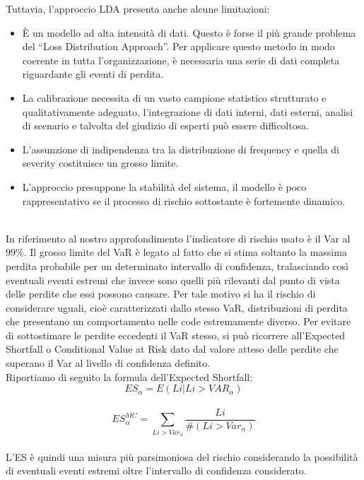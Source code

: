 \documentclass[titlepage]{article}
\begin{document}
\begin{itemize}
	 Tuttavia, l'approccio LDA presenta anche alcune limitazioni: 
	\begin{itemize}
	\item 	È un modello ad alta intensità di dati. Questo è forse il più grande problema del “Loss Distribution Approach”. Per applicare questo metodo in modo coerente in tutta l'organizzazione, è necessaria una serie di dati completa riguardante gli eventi di perdita.  
	\item La calibrazione necessita di un vasto campione statistico strutturato e qualitativamente adeguato, l’integrazione di dati interni, dati esterni, analisi di scenario e talvolta del giudizio di esperti può essere difficoltosa.  
	\item 	L’assunzione di indipendenza tra la distribuzione di frequency e quella di severity costituisce un grosso limite.  
	\item 	L’approccio presuppone la stabilità del sistema, il modello è poco rappresentativo se il processo di rischio sottostante è fortemente dinamico. 
\end{itemize}
\\
In riferimento al nostro approfondimento l’indicatore di rischio usato è il Var al 99\%. Il grosso limite del VaR è legato al fatto che si stima soltanto la massima perdita probabile per un determinato intervallo di confidenza, tralasciando così eventuali eventi estremi che invece sono quelli più rilevanti dal punto di vista delle perdite che essi possono causare. Per tale motivo si ha il rischio di considerare uguali, cioè caratterizzati dallo stesso VaR, distribuzioni di perdita che presentano un comportamento nelle code estremamente diverso. Per evitare di sottostimare le perdite eccedenti il VaR stesso, si può ricorrere all’Expected Shortfall o Conditional Value at Risk dato dal valore atteso delle perdite che superano il Var al livello di confidenza definito.\\Riportiamo di seguito la formula dell’Expected Shortfall:\\

$$ES_\alpha=E(Li|Li>VAR_\alpha)$$\\
$$ES^{MC}_\alpha=\sum_{Li>Var_\alpha} \frac{Li}{\#(Li>Var_\alpha)}$$
\\
L’ES è quindi una misura più parsimoniosa del rischio considerando la possibilità di eventuali eventi estremi oltre l’intervallo di confidenza considerato.


\end{itemize}
\end{document}
